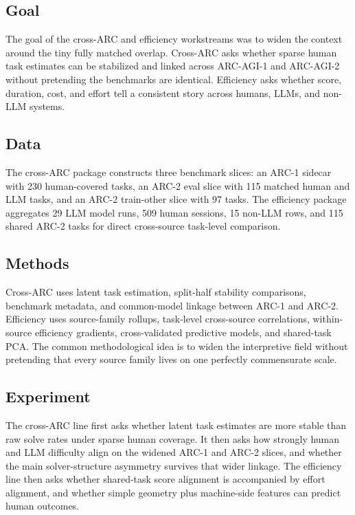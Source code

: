 \documentclass[11pt,letterpaper]{article}
\begin{document}
\subsection{Goal}

The goal of the cross-ARC and efficiency workstreams was to widen the context around the tiny fully matched overlap. Cross-ARC asks whether sparse human task estimates can be stabilized and linked across ARC-AGI-1 and ARC-AGI-2 without pretending the benchmarks are identical. Efficiency asks whether score, duration, cost, and effort tell a consistent story across humans, LLMs, and non-LLM systems.

\subsection{Data}

The cross-ARC package constructs three benchmark slices: an ARC-1 sidecar with 230 human-covered tasks, an ARC-2 eval slice with 115 matched human and LLM tasks, and an ARC-2 train-other slice with 97 tasks. The efficiency package aggregates 29 LLM model runs, 509 human sessions, 15 non-LLM rows, and 115 shared ARC-2 tasks for direct cross-source task-level comparison.

\subsection{Methods}

Cross-ARC uses latent task estimation, split-half stability comparisons, benchmark metadata, and common-model linkage between ARC-1 and ARC-2. Efficiency uses source-family rollups, task-level cross-source correlations, within-source efficiency gradients, cross-validated predictive models, and shared-task PCA. The common methodological idea is to widen the interpretive field without pretending that every source family lives on one perfectly commensurate scale.

\subsection{Experiment}

The cross-ARC line first asks whether latent task estimates are more stable than raw solve rates under sparse human coverage. It then asks how strongly human and LLM difficulty align on the widened ARC-1 and ARC-2 slices, and whether the main solver-structure asymmetry survives that wider linkage. The efficiency line then asks whether shared-task score alignment is accompanied by effort alignment, and whether simple geometry plus machine-side features can predict human outcomes.
\end{document}
